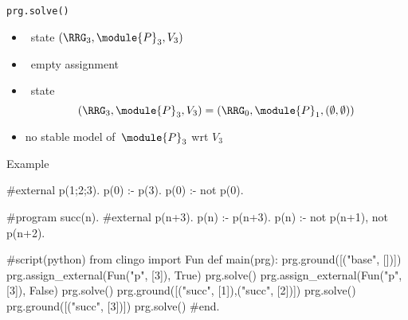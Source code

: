 \begin{frame}{\texttt{prg.solve()}}
  \begin{itemize}
  \item {} \clingo\ state $(\boldsymbol{\RRG}_3,\module{P}_3,V_3 )$
  \item {} \ empty assignment
    \medskip
  \item<2->  \clingo\ state
    \[
      (\boldsymbol{\RRG}_3,\module{P}_3,V_3 )
    = (\boldsymbol{\RRG}_0,\module{P}_1,(\emptyset,\emptyset) )
    \]
  \item<3-> no stable model of~$\module{P}_3$ wrt $V_3$
  \end{itemize}
\end{frame}
\begin{frame}[fragile]{Example}
\scriptsize\vspace{-10pt}%
\begin{semiverbatim}
   #external p(1;2;3).
   p(0) :- p(3).
   p(0) :- not p(0).

   #program succ(n).
   #external p(n+3).
   p(n) :- p(n+3).
   p(n) :- not p(n+1), not p(n+2).

   #script(python)
   from clingo import Fun
   def main(prg):
       prg.ground([("base", [])])
       prg.assign_external(Fun("p", [3]), True)
       prg.solve()
       prg.assign_external(Fun("p", [3]), False)
\only<1>{\alert{>>}}\only<2>{  }     \alert<1>{prg.solve()}
     \alert<2>{prg.ground([("succ", [1]),("succ", [2])])}
       prg.solve()
       prg.ground([("succ", [3])])
       prg.solve()
   #end.
\end{semiverbatim}
\end{frame}
